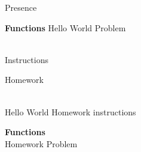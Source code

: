 \documentclass[english,ngerman]{article}
\begin{document}


\begin{exam}[Presence]{Presence}
  \begin{problem}{\bf Functions}
    Hello World Problem
  \end{problem}
  \begin{instructions}\\%
    Instructions
  \end{instructions}
\end{exam}

\newpage
\begin{exam}[Homework]{Homework}
  \begin{instructions}[\bf Homework]\\
    Hello World Homework instructions
  \end{instructions}

  \begin{problem}[3]{\bf Functions} \\
    Homework Problem
  \end{problem}
\end{exam}
\end{document}
